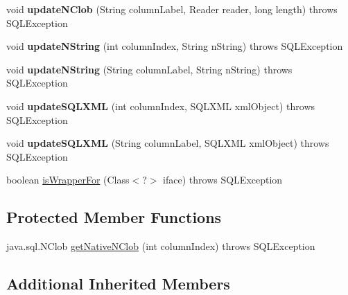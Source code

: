 \begin{DoxyCompactItemize}
\mbox{\label{classcom_1_1mysql_1_1jdbc_1_1_j_d_b_c4_result_set_afd70c26c0d760dbd80f4410dfbbde802}} 
void {\bfseries update\+N\+Clob} (String column\+Label, Reader reader, long length)  throws S\+Q\+L\+Exception 
\item 
\mbox{\label{classcom_1_1mysql_1_1jdbc_1_1_j_d_b_c4_result_set_a72bff558eeca3bb43c6aa4b23c66752b}} 
void {\bfseries update\+N\+String} (int column\+Index, String n\+String)  throws S\+Q\+L\+Exception 
\item 
\mbox{\label{classcom_1_1mysql_1_1jdbc_1_1_j_d_b_c4_result_set_a4fd74b21a0092595310365d3ed619c98}} 
void {\bfseries update\+N\+String} (String column\+Label, String n\+String)  throws S\+Q\+L\+Exception 
\item 
\mbox{\label{classcom_1_1mysql_1_1jdbc_1_1_j_d_b_c4_result_set_a13a10874d7c0430902d9e0a7ecdc781e}} 
void {\bfseries update\+S\+Q\+L\+X\+ML} (int column\+Index, S\+Q\+L\+X\+ML xml\+Object)  throws S\+Q\+L\+Exception 
\item 
\mbox{\label{classcom_1_1mysql_1_1jdbc_1_1_j_d_b_c4_result_set_ac4414886671b7498c6adbadc75f840e3}} 
void {\bfseries update\+S\+Q\+L\+X\+ML} (String column\+Label, S\+Q\+L\+X\+ML xml\+Object)  throws S\+Q\+L\+Exception 
\item 
boolean \mbox{\hyperlink{classcom_1_1mysql_1_1jdbc_1_1_j_d_b_c4_result_set_a57d383b2ccf7020664d948a4fc2c09ea}{is\+Wrapper\+For}} (Class$<$?$>$ iface)  throws S\+Q\+L\+Exception 
\end{DoxyCompactItemize}
\subsection*{Protected Member Functions}
\begin{DoxyCompactItemize}
\item 
java.\+sql.\+N\+Clob \mbox{\hyperlink{classcom_1_1mysql_1_1jdbc_1_1_j_d_b_c4_result_set_a6bf40393d9b07a198cc49ca934d42f10}{get\+Native\+N\+Clob}} (int column\+Index)  throws S\+Q\+L\+Exception 
\end{DoxyCompactItemize}
\subsection*{Additional Inherited Members}


